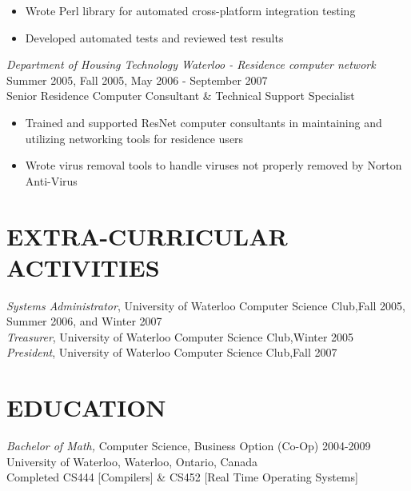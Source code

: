 \documentclass[10pt,line,margin=0.1]{newsres}
\begin{document}
\begin{resume}
\begin{itemize}
                  \item{Wrote Perl library for automated cross-platform integration testing}
                  \item{Developed automated tests and reviewed test results}
                \end{itemize}
                {\sl Department of Housing Technology Waterloo - Residence computer network} \hfill Summer 2005, Fall 2005, May 2006 - September 2007 \\
                Senior Residence Computer Consultant \& Technical Support Specialist
                \begin{itemize} \itemsep -2pt %
                  \item{Trained and supported ResNet computer consultants in maintaining and utilizing networking tools for residence users}
                  \item{Wrote virus removal tools to handle viruses not properly removed by Norton Anti-Virus}
                 \end{itemize}

 
\section{EXTRA-CURRICULAR \\ ACTIVITIES}             
        {\it Systems Administrator}, University of Waterloo Computer Science Club,\hfill  Fall 2005, Summer 2006, and Winter 2007 \\
        {\it Treasurer}, University of Waterloo Computer Science Club,\hfill Winter 2005 \\
        {\it President}, University of Waterloo Computer Science Club,\hfill Fall 2007 \\

\section{EDUCATION} {\sl Bachelor of Math,} Computer Science, Business Option (Co-Op) 2004-2009 \\
                University of Waterloo, Waterloo, Ontario, Canada \\
                Completed CS444 [Compilers] \& CS452 [Real Time Operating Systems]


\end{resume}
\end{document}
